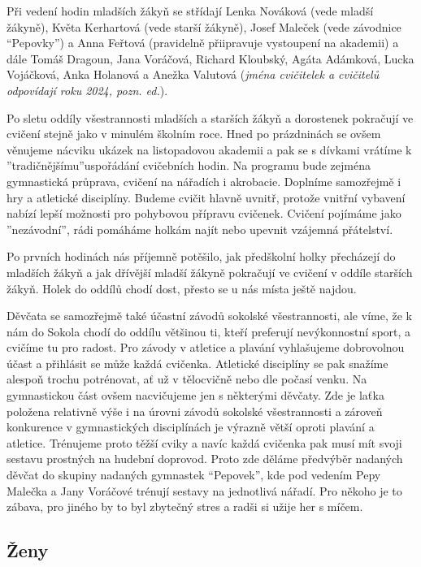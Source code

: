 Při vedení hodin mladších žákyň se střídají Lenka Nováková (vede mladší
žákyně), Květa Kerhartová (vede starší žákyně), Josef Maleček (vede
závodnice ``Pepovky'') a Anna Feřtová (pravidelně přiipravuje vystoupení
na akademii) a dále Tomáš Dragoun, Jana Voráčová, Richard Kloubský,
Agáta Adámková, Lucka Vojáčková, Anka Holanová a Anežka Valutová
(\emph{jména cvičitelek a cvičitelů odpovídají roku 2024, pozn. ed.}).

Po sletu oddíly všestrannosti mladších a starších žákyň a dorostenek
pokračují ve cvičení stejně jako v minulém školním roce. Hned po
prázdninách se ovšem věnujeme nácviku ukázek na listopadovou akademii a
pak se s dívkami vrátíme k ''tradičnějšímu''uspořádání cvičebních hodin.
Na programu bude zejména gymnastická průprava, cvičení na nářadích i
akrobacie. Doplníme samozřejmě i hry a atletické disciplíny. Budeme
cvičit hlavně uvnitř, protože vnitřní vybavení nabízí lepší možnosti pro
pohybovou přípravu cvičenek. Cvičení pojímáme jako ''nezávodní'', rádi
pomáháme holkám najít nebo upevnit vzájemná přátelství.

Po prvních hodinách nás příjemně potěšilo, jak předškolní holky
přecházejí do mladších žákyň a jak dřívější mladší žákyně pokračují ve
cvičení v oddíle starších žákyň. Holek do oddílů chodí dost, přesto se u
nás místa ještě najdou.

Děvčata se samozřejmě také účastní závodů sokolské všestrannosti, ale
víme, že k nám do Sokola chodí do oddílu většinou ti, kteří preferují
nevýkonnostní sport, a cvičíme tu pro radost. Pro závody v atletice a
plavání vyhlašujeme dobrovolnou účast a přihlásit se může každá
cvičenka. Atletické disciplíny se pak snažíme alespoň trochu potrénovat,
ať už v tělocvičně nebo dle počasí venku. Na gymnastickou část ovšem
nacvičujeme jen s některými děvčaty. Zde je laťka položena relativně
výše i na úrovni závodů sokolské všestrannosti a zároveň konkurence v
gymnastických disciplínách je výrazně větší oproti plavání a atletice.
Trénujeme proto těžší cviky a navíc každá cvičenka pak musí mít svoji
sestavu prostných na hudební doprovod. Proto zde děláme předvýběr
nadaných děvčat do skupiny nadaných gymnastek ``Pepovek'', kde pod
vedením Pepy Malečka a Jany Voráčové trénují sestavy na jednotlivá
nářadí. Pro někoho je to zábava, pro jiného by to byl zbytečný stres a
radši si užije her s míčem.

\subsection{Ženy}\label{ux17eeny}

